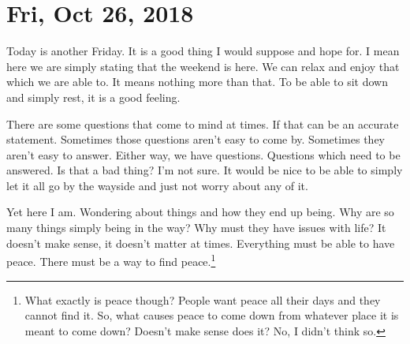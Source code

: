 \section{Fri, Oct 26, 2018}

Today is another Friday. It is a good thing I would suppose and hope for. I mean here
we are simply stating that the weekend is here. We can relax and enjoy that which we
are able to. It means nothing more than that. To be able to sit down and simply rest,
it is a good feeling.

There are some questions that come to mind at times. If that can be an accurate
statement. Sometimes those questions aren't easy to come by. Sometimes they aren't
easy to answer. Either way, we have questions. Questions which need to be answered.
Is that a bad thing? I'm not sure. It would be nice to be able to simply let it all
go by the wayside and just not worry about any of it.

Yet here I am. Wondering about things and how they end up being. Why are so many
things simply being in the way? Why must they have issues with life? It doesn't make
sense, it doesn't matter at times. Everything must be able to have peace. There must
be a way to find peace.\footnote{What exactly is peace though? People want peace all 
their days and they cannot find it. So, what causes peace to come down from whatever
place it is meant to come down? Doesn't make sense does it? No, I didn't think so.}